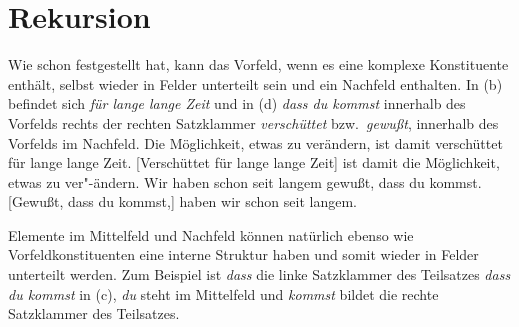 \section{Rekursion}
\label{sec-topo-rekursion}

Wie schon \citet[]{Reis80a} festgestellt hat, kann das Vorfeld,
wenn es eine komplexe Konstituente enthält, selbst wieder
in Felder unterteilt sein und \zb ein Nachfeld enthalten.
In (b) befindet sich \emph{für lange lange Zeit} und in
(d) \emph{dass du kommst} innerhalb des Vorfelds rechts der
rechten Satzklammer \emph{verschüttet} bzw.\ \emph{gewußt}, \dash
innerhalb des Vorfelds im Nachfeld.
\eal
\ex Die Möglichkeit, etwas zu verändern, ist damit verschüttet
      für lange lange Zeit.
\ex {}[Verschüttet für lange lange Zeit] ist damit die Möglichkeit, 
      etwas zu ver"-ändern.
\ex Wir haben schon seit langem gewußt, dass du kommst.
\ex {}[Gewußt, dass du kommst,] haben wir schon seit langem.
\zl

\noindent
Elemente im Mittelfeld und Nachfeld können natürlich ebenso wie
Vorfeldkonstituenten eine interne Struktur haben und somit wieder
in Felder unterteilt werden. Zum Beispiel ist \emph{dass} die linke Satzklammer des Teilsatzes
\emph{dass du kommst} in (c), \emph{du} steht im Mittelfeld und \emph{kommst} bildet die
rechte Satzklammer des Teilsatzes.%






